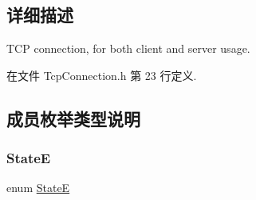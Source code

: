\subsection{详细描述}
T\+CP connection, for both client and server usage. 

在文件 Tcp\+Connection.\+h 第 23 行定义.



\subsection{成员枚举类型说明}
\mbox{\label{classmuduo_1_1TcpConnection_a8cf72f776f4277c8138a1beaf5185325}} 
\subsubsection{\texorpdfstring{StateE}{StateE}}
{\footnotesize\ttfamily enum \hyperlink{classmuduo_1_1TcpConnection_a8cf72f776f4277c8138a1beaf5185325}{StateE}\hspace{0.3cm}{\ttfamily [private]}}

